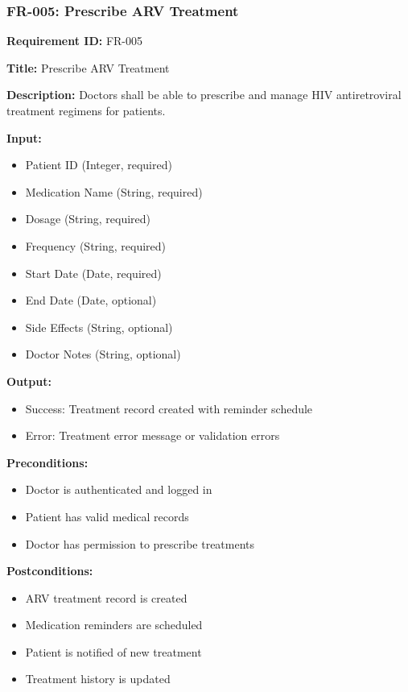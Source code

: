 \documentclass[12pt,a4paper]{article}
\begin{document}
\subsubsection{FR-005: Prescribe ARV Treatment}

\textbf{Requirement ID:} FR-005

\textbf{Title:} Prescribe ARV Treatment

\textbf{Description:} Doctors shall be able to prescribe and manage HIV antiretroviral treatment regimens for patients.

\textbf{Input:}
\begin{itemize}
    \item Patient ID (Integer, required)
    \item Medication Name (String, required)
    \item Dosage (String, required)
    \item Frequency (String, required)
    \item Start Date (Date, required)
    \item End Date (Date, optional)
    \item Side Effects (String, optional)
    \item Doctor Notes (String, optional)
\end{itemize}

\textbf{Output:}
\begin{itemize}
    \item Success: Treatment record created with reminder schedule
    \item Error: Treatment error message or validation errors
\end{itemize}

\textbf{Preconditions:}
\begin{itemize}
    \item Doctor is authenticated and logged in
    \item Patient has valid medical records
    \item Doctor has permission to prescribe treatments
\end{itemize}

\textbf{Postconditions:}
\begin{itemize}
    \item ARV treatment record is created
    \item Medication reminders are scheduled
    \item Patient is notified of new treatment
    \item Treatment history is updated
\end{itemize}
\end{document}
